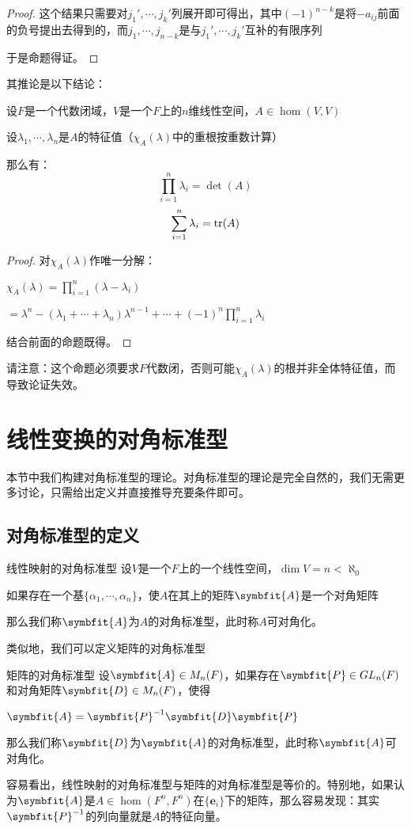 \documentclass[12pt, a4paper, oneside, UTF8]{ctexbook}
\begin{document}
\begin{para}{0}
\begin{proof}
						这个结果只需要对$j_1',\cdots,j_k'$列展开即可得出，其中$(-1)^{n-k}$是将$-a_{ij}$前面的负号提出去得到的，而$j_1,\cdots,j_{n-k}$是与$j_1',\cdots,j_k'$互补的有限序列

						于是命题得证。
					\end{proof}
					其推论是以下结论：
					\begin{corollary}{}{}
						设$F$是一个代数闭域，$V$是一个$F$上的$n$维线性空间，$A \in \hom(V,V)$

						设$\lambda_1,\cdots,\lambda_n$是$A$的特征值（$\chi_A(\lambda )$中的重根按重数计算）

						那么有：
						\begin{equation}
							\prod\limits_{i=1}^{n} \lambda_i = \det(A)
						\end{equation}
						\begin{equation}
							\sum\limits_{i=1}^{n} \lambda_i = \operatorname{tr}(A)
						\end{equation}
					\end{corollary}
					\begin{proof}
						对$\chi_A(\lambda )$作唯一分解：

						$\chi_A(\lambda )=\prod\limits_{i=1}^{n}(\lambda -\lambda_i)$

						$=\lambda^n - (\lambda_1+\cdots+\lambda_n)\lambda^{n-1}+\cdots+(-1)^n \prod_{i=1}^{n}\lambda_i$

						结合前面的命题既得。
					\end{proof}
					请注意：这个命题必须要求$F$代数闭，否则可能$\chi_A(\lambda )$的根并非全体特征值，而导致论证失效。
			\end{para}
	\section{线性变换的对角标准型}
		本节中我们构建对角标准型的理论。对角标准型的理论是完全自然的，我们无需更多讨论，只需给出定义并直接推导充要条件即可。
		\subsection{对角标准型的定义}
			\begin{defn}{线性映射的对角标准型}{}
				设$V$是一个$F$上的一个线性空间，$\dim V = n < \aleph_0$

				如果存在一个基$\{\alpha_1,\cdots,\alpha_n\}$，使$A$在其上的矩阵$\symbfit{A}$是一个对角矩阵

				那么我们称$\symbfit{A}$为$A$的对角标准型，此时称$A$可对角化。
			\end{defn}
			类似地，我们可以定义矩阵的对角标准型
			\begin{defn}{矩阵的对角标准型}{}
				设$\symbfit{A} \in M_n(F)$，如果存在$\symbfit{P}\in GL_n(F)$和对角矩阵$\symbfit{D}\in M_n(F)$，使得

				$\symbfit{A}=\symbfit{P}^{-1}\symbfit{D}\symbfit{P}$

				那么我们称$\symbfit{D}$为$\symbfit{A}$的对角标准型，此时称$\symbfit{A}$可对角化。
			\end{defn}
			容易看出，线性映射的对角标准型与矩阵的对角标准型是等价的。特别地，如果认为$\symbfit{A}$是$A \in \hom(F^n,F^n)$在$\{\mathbf{e}_i\}$下的矩阵，那么容易发现：其实$\symbfit{P}^{-1}$的列向量就是$A$的特征向量。
\end{document}
